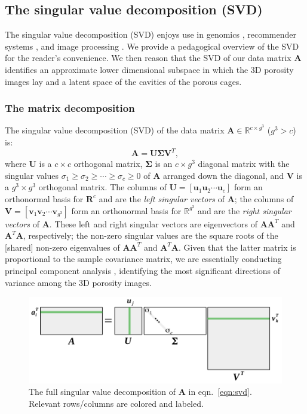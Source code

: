 \documentclass[journal=jacsat,manuscript=article,layout=traditional]{achemso}
\begin{document}
\subsection{The singular value decomposition (SVD)}
The singular value decomposition (SVD) \cite{muller2004singular,kalman1996singularly,strang1993introduction} enjoys use in genomics \cite{alter2000singular}, recommender systems \cite{koren2008factorization}, and image processing \cite{muller2004singular}. {\color{red} We provide a pedagogical overview of the SVD for the reader's convenience.} We then reason that the SVD of our data matrix $\mathbf{A}$ identifies an approximate lower dimensional subspace in which the 3D porosity images lay and a latent space of the cavities of the porous cages.

\subsubsection{The matrix decomposition}
The singular value decomposition (SVD) of the data matrix $\mathbf{A} \in \mathbb{R} ^{c \times g^3}$ ($g^3 > c$) is:
\begin{equation}
\mathbf{A}=\mathbf{U} \mathbf{\Sigma} \mathbf{V}^T,
\label{eqn:svd}
\end{equation} where $\mathbf{U}$ is a $c \times c$ orthogonal matrix, $\mathbf{\Sigma}$ is an $c\times g^3$ diagonal matrix with the singular values 
$\sigma_1 \geq \sigma_2 \geq \cdots \geq \sigma_{c} \geq 0$ of $\mathbf{A}$ arranged down the diagonal, and $\mathbf{V}$ is a $g^3 \times g^3$ orthogonal matrix. The columns of $\mathbf{U} = [\mathbf{u}_1 \mathbf{u}_2 \cdots \mathbf{u}_c]$ form an orthonormal basis for $\mathbf{R}^c$ and are the \emph{left singular vectors} of $\mathbf{A}$; the columns of $\mathbf{V}=[\mathbf{v}_1 \mathbf{v}_2 \cdots \mathbf{v}_{g^3}]$ form an orthonormal basis for $\mathbb{R}^{g^3}$ and are the \emph{right singular vectors} of $\mathbf{A}$. These left and right singular vectors are eigenvectors of $\mathbf{A}\mathbf{A}^T$ and $\mathbf{A}^T\mathbf{A}$, respectively; the non-zero singular values are the square roots of the [shared] non-zero eigenvalues of $\mathbf{A}\mathbf{A}^T$ and $\mathbf{A}^T\mathbf{A}$. Given that the latter matrix is proportional to the sample covariance matrix, we are essentially conducting principal component analysis \cite{strang1993introduction}, identifying the most significant directions of variance among the 3D porosity images.

\begin{figure}
\centering
	\includegraphics[width=0.75\columnwidth]{svd-crop.pdf}
	\caption{The full singular value decomposition of $\mathbf{A}$ in eqn.~\ref{eqn:svd}. {\color{red} Relevant rows/columns are colored and labeled.}
	} \label{fig:svd}
\end{figure}
\end{document}
